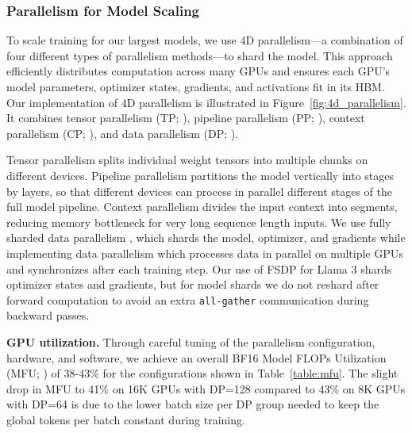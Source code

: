\subsubsection{Parallelism for Model Scaling}
\label{section:4D-parallelism}

To scale training for our largest models, we use 4D parallelism—a combination of four different types of parallelism methods—to shard the model. This approach efficiently distributes computation across many GPUs and ensures each GPU's model parameters, optimizer states, gradients, and activations fit in its HBM. Our implementation of 4D parallelism is illustrated in Figure~\ref{fig:4d_parallelism}. It combines tensor parallelism (TP; \citet{NIPS2012_c399862d, shoeybi2019megatron, korthikanti2023reducing}), pipeline parallelism (PP; \citet{huang2019gpipe, narayanan2021efficient, lamy2023breadth}), context parallelism (CP; \citet{liu2023ring}), and data parallelism (DP; \citet{rajbhandari2020zeromemoryoptimizationstraining, ren2021zerooffloaddemocratizingbillionscalemodel, zhao2023pytorch}).

Tensor parallelism splits individual weight tensors into multiple chunks on different devices. Pipeline parallelism partitions the model vertically into stages by layers, so that different devices can process in parallel different stages of the full model pipeline. Context parallelism divides the input context into segments, reducing memory bottleneck for very long sequence length inputs. We use fully sharded data parallelism \citep[FSDP;][]{rajbhandari2020zeromemoryoptimizationstraining, ren2021zerooffloaddemocratizingbillionscalemodel, zhao2023pytorch}, which shards the model, optimizer, and gradients while implementing data parallelism which processes data in parallel on multiple GPUs and synchronizes after each training step. Our use of FSDP for Llama 3 shards optimizer states and gradients, but for model shards we do not reshard after forward computation to avoid an extra \texttt{all-gather} communication during backward passes.

\textbf{GPU utilization.}
Through careful tuning of the parallelism configuration, hardware, and software, we achieve an overall BF16 Model FLOPs Utilization (MFU; \citet{chowdhery2023palm}) of 38-43\% for the configurations shown in Table~\ref{table:mfu}.  The slight drop in MFU to 41\% on 16K GPUs with DP=128 compared to 43\% on 8K GPUs with DP=64 is due to the lower batch size per DP group needed to keep the global tokens per batch constant during training.

